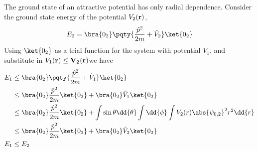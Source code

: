 \documentclass[12pt]{article}
\begin{document}
        \subsection{} \subsubsection{} The ground state of an attractive potential has only radial dependence. Consider the ground state energy of the potential \(V_2(\bf r)\), \[
            E_2 =\bra{0_2} \pqty{\frac{\hat{p}^2}{2m} +\hat{V}_2}\ket{0_2} 
        \]
        Using \(\ket{0_2} \) as a trial function for the system with potential \(V_1\), and substitute in \(V_1(\bf r) \leq V_2(\bf r)\)we have \begin{align*}
            E_1 &\leq \bra{0_2} \pqty{\frac{\hat{p}^2}{2m} +\hat{V}_1}\ket{0_2}\\
            &\leq \bra{0_2}\frac{\hat{p}^2}{2m}\ket{0_2} + \bra{0_2} \hat{V}_1\ket{0_2} \\
            &\leq \bra{0_2}\frac{\hat{p}^2}{2m}\ket{0_2} + \int \sin\theta \dd{\theta} \int \dd{\phi}  \int V_2(r) \abs{\psi_{0,2}}^2 r^2\dd{r}\\
            &\leq \bra{0_2}\frac{\hat{p}^2}{2m}\ket{0_2} + \bra{0_2} \hat{V}_2\ket{0_2} \\
            E_1&\leq E_2
        \end{align*}
\end{document}
